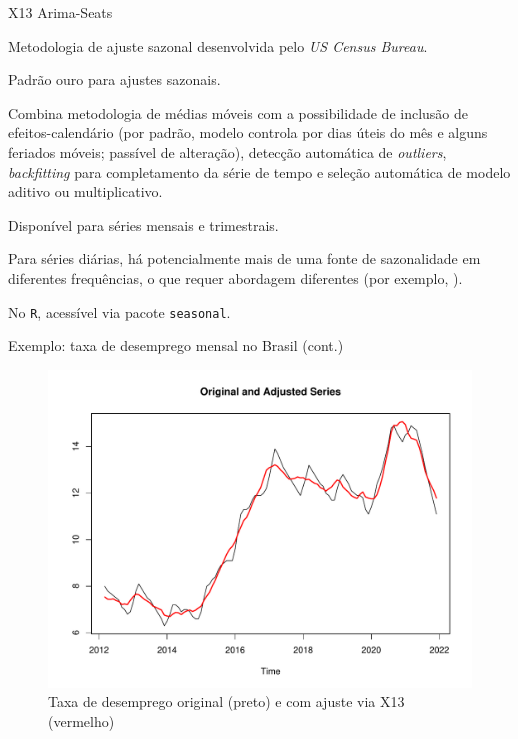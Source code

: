 \documentclass[11pt]{beamer}
\newenvironment{wideitemize}{\itemize\addtolength{\itemsep}{10pt}}{\enditemize}
\newenvironment{halfwideitemize}{\itemize\addtolength{\itemsep}{0.5em}}{\enditemize}
\begin{document}
\begin{frame}{X13 Arima-Seats}
	\begin{wideitemize}
		\item Metodologia de ajuste sazonal desenvolvida pelo \textit{US Census Bureau}.
		\item Padrão ouro para ajustes sazonais.
		\begin{halfwideitemize}
			\item Combina metodologia de médias móveis com a possibilidade de inclusão de efeitos-calendário (por padrão, modelo controla por dias úteis do mês e alguns feriados móveis; passível de alteração), detecção automática de \textit{outliers}, \textit{backfitting} para completamento da série de tempo e seleção automática de modelo aditivo ou multiplicativo. 
		\end{halfwideitemize}
		\item Disponível para séries mensais e trimestrais.
		\begin{halfwideitemize}
			\item Para séries diárias, há potencialmente mais de uma fonte de sazonalidade em diferentes frequências, o que requer abordagem diferentes (por exemplo, \cite{DeLivera2012}).
		\end{halfwideitemize}
		\item No \texttt{R}, acessível via pacote \texttt{seasonal}.
	\end{wideitemize}
\end{frame}

\begin{frame}{Exemplo: taxa de desemprego mensal no Brasil (cont.)}
	\begin{figure}
		\caption{Taxa de desemprego original (preto) e com ajuste via X13 (vermelho)}
		\includegraphics[scale=0.4]{graficos/desemprego_x13.pdf}
	\end{figure}
\end{frame}
\end{document}
